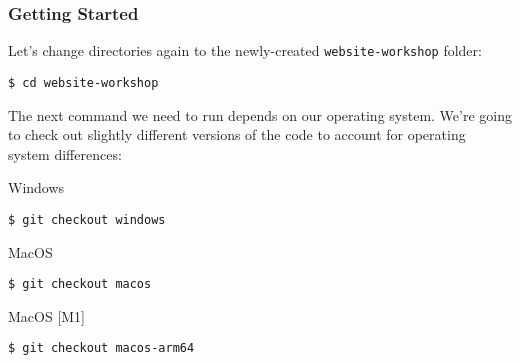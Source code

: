\begin{frame}[fragile]
    \frametitle{Getting Started}

    Let's change directories again to the newly-created \texttt{website-workshop} folder:
   
    \bigskip
    
    \begin{lstlisting}[style=saneCode,gobble=8]
        $ cd website-workshop
    \end{lstlisting}

    \vfill

    The next command we need to run depends on our operating system. We're going to check out slightly different
    versions of the code to account for operating system differences:

    \medskip

    \begin{block}{Windows}
    \begin{lstlisting}[style=saneCode,gobble=8]
        $ git checkout windows
    \end{lstlisting}
    \end{block}
    
    \begin{block}{MacOS}
    \begin{lstlisting}[style=saneCode,gobble=8]
        $ git checkout macos
    \end{lstlisting}
    \end{block}

    \begin{block}{MacOS [M1]}
    \begin{lstlisting}[style=saneCode,gobble=8]
        $ git checkout macos-arm64
    \end{lstlisting}
    \end{block}

\end{frame}
